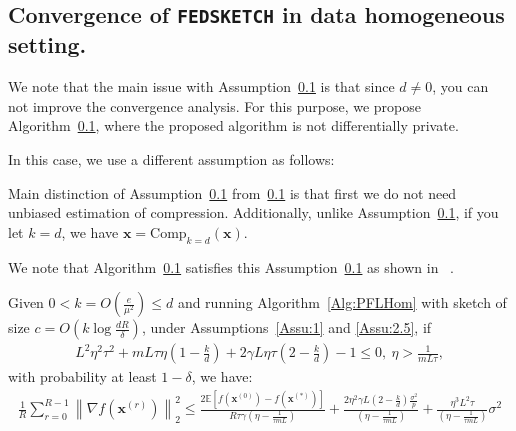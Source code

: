 \subsection{Convergence of \texttt{FEDSKETCH} in data homogeneous setting.} 

We note that the main issue with Assumption~\ref{} is that since $d\neq 0$, you can not improve the convergence analysis. For this purpose, we propose Algorithm~\ref{}, where the proposed algorithm is not differentially private.

In this case, we use a different assumption as follows:

\begin{remark}
Main distinction of Assumption~\ref{} from~\ref{} is that first we do not need unbiased estimation of compression. Additionally, unlike Assumption~\ref{}, if you let $k=d$, we have $\boldsymbol{x}=\text{Comp}_{k=d}(\boldsymbol{x})$.    
\end{remark}




We note that Algorithm~\ref{} satisfies this Assumption~\ref{} as shown in ~\cite{ivkin2019communication}.

\begin{theorem}
Given $0<k=O\left(\frac{e}{\mu^2}\right)\leq d$
and running Algorithm~\ref{Alg:PFLHom} with sketch of size $c=O\left(k\log \frac{d R}{\delta}\right)$,  under Assumptions~\ref{Assu:1} and \ref{Assu:2.5}, if 
\begin{align}
       L^2\eta^2\tau^2+mL\tau\eta\left(1-\frac{k}{d}\right)+2\gamma L\eta\tau\left(2-\frac{k}{d}\right)-1\leq 0,\:\eta> \frac{1}{mL\tau},\label{eq:cnd-lrs-h-ii} 
\end{align}
with probability at least $1-\delta$, we have:
\begin{align}
    \frac{1}{R}\sum_{r=0}^{R-1}\left\|\nabla f({\boldsymbol{x}}^{(r)})\right\|_2^2\leq \frac{2 \mathbb{E}\left[f({\boldsymbol{x}}^{(0)})-f({\boldsymbol{x}}^{(*)})\right]}{R\tau \gamma \left({\eta}-\frac{1}{\tau mL}\right)}+\frac{2\eta^2\gamma L\left(2-\frac{k}{d}\right)\frac{\sigma^2}{p}}{ \left({\eta}-\frac{1}{\tau mL}\right)}+\frac{\eta^3L^2\tau}{\left({\eta}-\frac{1}{\tau mL}\right)}\sigma^2 
\end{align}
\end{theorem}
\begin{remark}[$k=d$]
\end{remark}

